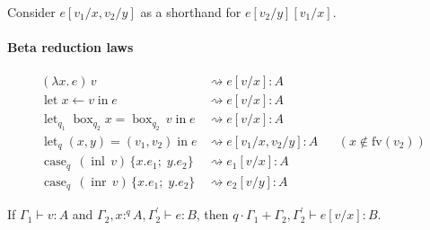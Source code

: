 \documentclass[acmsmall,screen,nonacm]{acmart}
\DeclareMathOperator{\llet}{\text{let}}
\DeclareMathOperator{\lin}{\text{in}}
\DeclareMathOperator{\case}{\text{case}}
\DeclareMathOperator{\bbox}{\text{box}}
\DeclareMathOperator{\inl}{\text{inl}}
\DeclareMathOperator{\inr}{\text{inr}}
\newcommand{\tee}{\vdash}
\DeclareMathOperator{\red}{\rightsquigarrow}
\begin{document}
Consider $e[v_1/x, v_2/y]$ as a shorthand for $e[v_2/y][v_1/x]$.

\paragraph{Beta reduction laws}

\begin{align*}
  (\lambda x.\, e)\, v &\red e[v/x] : A \\
  \llet x \leftarrow v \lin e &\red e[v/x] : A \\
  \llet_{q_1} \bbox_{q_2} x = \bbox_{q_2}\, v \lin e &\red e[v/x] : A \\
  \llet_q (x, y) = (v_1, v_2) \lin e &\red e[v_1/x, v_2/y] : A
    && (x \notin \mathrm{fv}(v_2)) \\
  \case_q\, (\inl\, v)\, \{x.e_1;\; y.e_2\} &\red e_1[v/x] : A \\
  \case_q\, (\inr\, v)\, \{x.e_1;\; y.e_2\} &\red e_2[v/y] : A
\end{align*}

\begin{lemma}
\label{lem:graded-modal-forward-substitution}
  If $\Gamma_1 \tee v : A$ and $\Gamma_2, x :^q A, \Gamma_2^\prime \tee e : B$, then $q \cdot \Gamma_1 + \Gamma_2, \Gamma_2^\prime \tee e[v/x] : B$.
\end{lemma}
\end{document}
